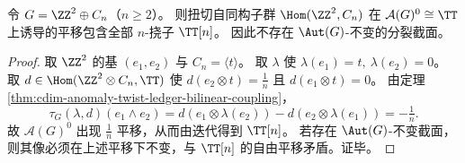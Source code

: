 \begin{corollary}[秩 \(2\) 情形的满挠平移与不变截面不存在]\label{cor:cdim-anomaly-rank2-full-torsion-translation}
令 \(G=\ZZ^2\oplus C_n\)（\(n\ge 2\)）。
则扭切自同构子群 \(\Hom(\ZZ^2,C_n)\) 在 \(\mathcal A(G)^0\cong\TT\) 上诱导的平移包含全部 \(n\)-挠子 \(\TT[n]\)。
因此不存在 \(\Aut(G)\)-不变的分裂截面。
\end{corollary}
\begin{proof}
取 \(\ZZ^2\) 的基 \((e_1,e_2)\) 与 \(C_n=\langle t\rangle\)。
取 \(\lambda\) 使 \(\lambda(e_1)=t,\ \lambda(e_2)=0\)。
取 \(d\in\Hom(\ZZ^2\otimes C_n,\TT)\) 使 \(d(e_2\otimes t)=\tfrac1n\) 且 \(d(e_1\otimes t)=0\)。
由定理 \ref{thm:cdim-anomaly-twist-ledger-bilinear-coupling}，
\[
\tau_G(\lambda,d)(e_1\wedge e_2)=d(e_1\otimes\lambda(e_2))-d(e_2\otimes\lambda(e_1))=-\tfrac1n.
\]
故 \(\mathcal A(G)^0\) 出现 \(\tfrac1n\) 平移，从而由迭代得到 \(\TT[n]\)。
若存在 \(\Aut(G)\)-不变截面，则其像必须在上述平移下不变，与 \(\TT[n]\) 的自由平移矛盾。证毕。
\end{proof}





\endinput
